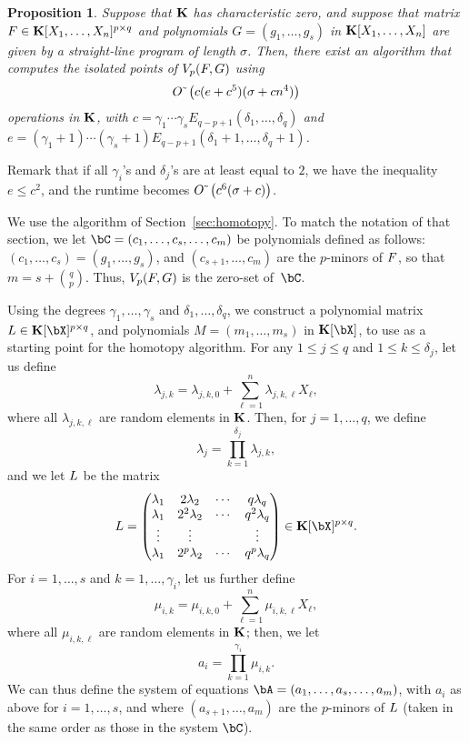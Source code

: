 \documentclass[12pt]{article}
\newtheorem{proposition}[definition]{Proposition}
\begin{document}
\begin{proposition}
  Suppose that $\mathbf{K}$ has characteristic zero, and suppose that matrix
  ${F} \in \mathbf{K}[X_1,\dots,X_n]^{p \times q}$ and polynomials
  $G=(g_1,\dots,g_s)$ in $\mathbf{K}[X_1,\dots,X_n]$ are given by a
  straight-line program of length $\sigma$. Then, there exist 
an algorithm that computes the isolated points of
  $V_{p}({F},G)$ using $${O}{\,\tilde{ }\,}\left (c(e+c^5 )(\sigma + cn^4)\right)$$
  operations in $\mathbf{K}$, with
  $c=\gamma_1\cdots\gamma_sE_{q-p+1}(\delta_1, \ldots, \delta_q)$ and
  $e=(\gamma_1+1)\cdots(\gamma_s+1) E_{q-p+1}(\delta_1+1, \ldots,
  \delta_q+1)$.
\end{proposition}
Remark that if all $\gamma_i$'s and $\delta_j$'s are at least equal to
$2$, we have the inequality $e \le c^2$, and the runtime becomes
${O}{\,\tilde{ }\,}\left (c^6 (\sigma + c)\right)$.

\medskip

We use the algorithm of Section~\ref{sec:homotopy}. To match the
notation of that section, we let $\bC=(c_1,\dots,c_{s},\dots,c_m)$ be
polynomials defined as follows: $(c_1,\dots,c_{s})=(g_1,\dots,g_s)$,
and $(c_{s+1},\dots,c_{m})$ are the $p$-minors of ${F}$, so that 
$m=s+{q \choose p}$. Thus, $V_{p}({F},G)$ is the zero-set of~$\bC$.

Using the degrees $\gamma_1,\dots,\gamma_s$ and  $\delta_1,\dots,\delta_q$, we construct a polynomial matrix $\mL \in
\KK[\bX]^{p \times q}$, and polynomials $M=(m_1,\dots,m_s)$ in
$\KK[\bX]$, to use as a starting point for the homotopy
algorithm. For any $1 \leq j \leq q$ and $1 \leq k \leq \delta_j$, let us
define $$\lambda_{j,k} = \lambda_{j,k,0} + \sum_{\ell = 1}^{n}\lambda_{j,k,\ell}X_\ell,$$ 
where all $\lambda_{j,k,\ell}$ are random elements in
$\mathbf{K}$. Then, for $j=1,\dots,q$, we define
$$\lambda_j = \prod_{k=1}^{\delta_j}\lambda_{j,k},$$
and we let  ${L}$ be the matrix
\begin{align}\label{eqdef:col}
\mL = 
\left( \begin{matrix}
\lambda_1 & 2\lambda_2 & \cdots & q\lambda_{q}\\
\lambda_1 & 2^2\lambda_2 & \cdots & q^2\lambda_q\\
\vdots & \vdots &  & \vdots \\
\lambda_1 & 2^p\lambda_2 & \cdots & q^p\lambda_q
\end{matrix} \right) \in \KK[\bX]^{p\times q}.
\end{align}
For $i=1,\dots,s$ and $k=1,\dots,\gamma_i$, let us further define
$$\mu_{i,k} =  \mu_{i,k,0} + \sum_{\ell = 1}^{n}\mu_{i,k,\ell}X_\ell,$$ where
all $\mu_{i,k,\ell}$ are random elements in $\mathbf{K}$; then, we let
$$a_i=\prod_{k=1}^{\gamma_i} \mu_{i,k}.$$ We can thus define the
system of equations $\bA=(a_1,\dots,a_s,\dots,a_m)$, with $a_i$ as
above for $i=1,\dots,s$, and where $(a_{s+1},\dots,a_{m})$ are the
$p$-minors of ${L}$ (taken in the same order as those in the system
$\bC$).
\end{document}
